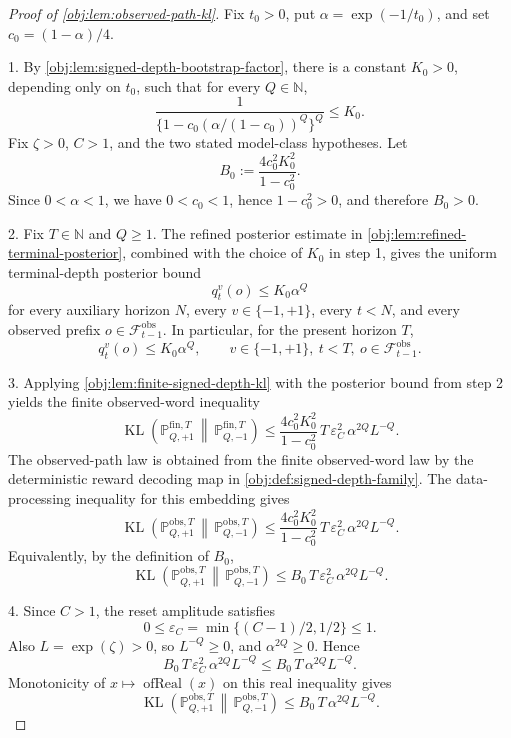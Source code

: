 \documentclass[11pt]{article}
\begin{document}
\begin{proof}[Proof of \cref{obj:lem:observed-path-kl}]
Fix \(t_0>0\), put \(\alpha=\exp(-1/t_0)\), and set \(c_0=(1-\alpha)/4\).

1.  By \cref{obj:lem:signed-depth-bootstrap-factor}, there is a constant \(K_0>0\), depending only on \(t_0\), such that for every \(Q\in\mathbb N\),
\[
\frac{1}{\{1-c_0(\alpha/(1-c_0))^Q\}^Q}\le K_0 .
\]
Fix \(\zeta>0\), \(C>1\), and the two stated model-class hypotheses. Let
\[
B_0:=\frac{4c_0^2K_0^2}{1-c_0^2}.
\]
Since \(0<\alpha<1\), we have \(0<c_0<1\), hence \(1-c_0^2>0\), and therefore \(B_0>0\). %

2.  Fix \(T\in\mathbb N\) and \(Q\ge1\). The refined posterior estimate in \cref{obj:lem:refined-terminal-posterior}, combined with the choice of \(K_0\) in step 1, gives the uniform terminal-depth posterior bound
\[
q_t^v(o)\le K_0\alpha^Q
\]
for every auxiliary horizon \(N\), every \(v\in\{-1,+1\}\), every \(t<N\), and every observed prefix \(o\in\mathcal F_{t-1}^{\mathrm{obs}}\). In particular, for the present horizon \(T\),
\[
q_t^v(o)\le K_0\alpha^Q,
\qquad
v\in\{-1,+1\},\ t<T,\ o\in\mathcal F_{t-1}^{\mathrm{obs}} .
\] %

3.  Applying \cref{obj:lem:finite-signed-depth-kl} with the posterior bound from step 2 yields the finite observed-word inequality
\[
\operatorname{KL}\!\left(
\mathbb P_{Q,+1}^{\mathrm{fin},T}
\,\middle\|\,
\mathbb P_{Q,-1}^{\mathrm{fin},T}
\right)
\le
\frac{4c_0^2K_0^2}{1-c_0^2}\,
T\,\varepsilon_C^2\,\alpha^{2Q}L^{-Q}.
\]
The observed-path law is obtained from the finite observed-word law by the deterministic reward decoding map in \cref{obj:def:signed-depth-family}. The data-processing inequality for this embedding gives
\[
\operatorname{KL}\!\left(
\mathbb P_{Q,+1}^{\mathrm{obs},T}
\,\middle\|\,
\mathbb P_{Q,-1}^{\mathrm{obs},T}
\right)
\le
\frac{4c_0^2K_0^2}{1-c_0^2}\,
T\,\varepsilon_C^2\,\alpha^{2Q}L^{-Q}.
\]
Equivalently, by the definition of \(B_0\),
\[
\operatorname{KL}\!\left(
\mathbb P_{Q,+1}^{\mathrm{obs},T}
\,\middle\|\,
\mathbb P_{Q,-1}^{\mathrm{obs},T}
\right)
\le
B_0\,T\,\varepsilon_C^2\,\alpha^{2Q}L^{-Q}.
\] %

4.  Since \(C>1\), the reset amplitude satisfies
\[
0\le \varepsilon_C=\min\{(C-1)/2,1/2\}\le 1 .
\]
Also \(L=\exp(\zeta)>0\), so \(L^{-Q}\ge0\), and \(\alpha^{2Q}\ge0\). Hence
\[
B_0\,T\,\varepsilon_C^2\,\alpha^{2Q}L^{-Q}
\le
B_0\,T\,\alpha^{2Q}L^{-Q}.
\]
Monotonicity of \(x\mapsto \operatorname{ofReal}(x)\) on this real inequality gives
\[
\operatorname{KL}\!\left(
\mathbb P_{Q,+1}^{\mathrm{obs},T}
\,\middle\|\,
\mathbb P_{Q,-1}^{\mathrm{obs},T}
\right)
\le
B_0\,T\,\alpha^{2Q}L^{-Q}.
\] %


\end{proof}
\end{document}

